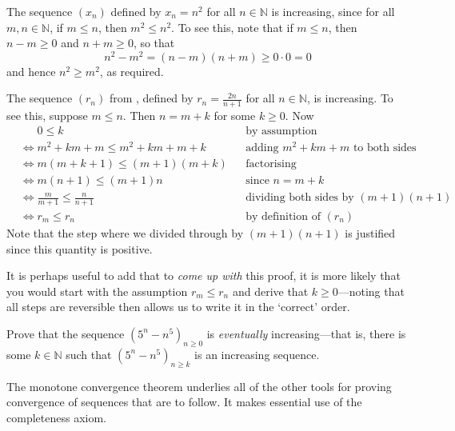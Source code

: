 \begin{example}
The sequence $(x_n)$ defined by $x_n=n^2$ for all $n \in \mathbb{N}$ is increasing, since for all $m,n \in \mathbb{N}$, if $m \le n$, then $m^2 \le n^2$. To see this, note that if $m \le n$, then $n-m \ge 0$ and $n+m \ge 0$, so that
\[ n^2-m^2 = (n-m)(n+m) \ge 0 \cdot 0 = 0 \]
and hence $n^2 \ge m^2$, as required.
\end{example}

\begin{example}
\label{exTwoNOverNPlusOneIncreasing}
The sequence $(r_n)$ from , defined by $r_n=\frac{2n}{n+1}$ for all $n \in \mathbb{N}$, is increasing. To see this, suppose $m \le n$. Then $n=m+k$ for some $k \ge 0$. Now
\begin{align*}
&\phantom{\Rightarrow} 0 \le k && \text{by assumption} \\
&\Leftrightarrow m^2+km+m \le m^2+km+m+k && \text{adding $m^2+km+m$ to both sides} \\
&\Leftrightarrow m(m+k+1) \le (m+1)(m+k) && \text{factorising} \\
&\Leftrightarrow m(n+1) \le (m+1)n && \text{since $n=m+k$} \\
&\Leftrightarrow \frac{m}{m+1} \le \frac{n}{n+1} && \text{dividing both sides by $(m+1)(n+1)$} \\
&\Leftrightarrow r_m \le r_n && \text{by definition of $(r_n)$}
\end{align*}
Note that the step where we divided through by $(m+1)(n+1)$ is justified since this quantity is positive.

It is perhaps useful to add that to \textit{come up with} this proof, it is more likely that you would start with the assumption $r_m \le r_n$ and derive that $k \ge 0$---noting that all steps are reversible then allows us to write it in the `correct' order.
\end{example}

\begin{exercise}
Prove that the sequence $(5^n-n^5)_{n \ge 0}$ is \textit{eventually} increasing---that is, there is some $k \in \mathbb{N}$ such that $(5^n-n^5)_{n \ge k}$ is an increasing sequence.
\end{exercise}

The monotone convergence theorem underlies all of the other tools for proving convergence of sequences that are to follow. It makes essential use of the completeness axiom.


